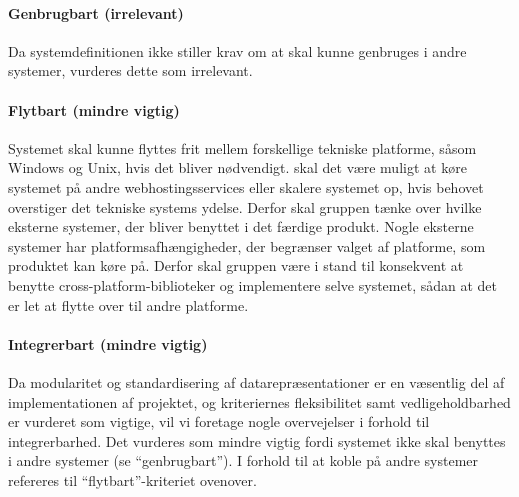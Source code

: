 \paragraph{Genbrugbart (irrelevant)} 
Da systemdefinitionen ikke stiller krav om at \Foodl{} skal kunne genbruges i andre systemer, vurderes dette som irrelevant.

\paragraph{Flytbart (mindre vigtig)} 
Systemet skal kunne flyttes frit mellem forskellige tekniske platforme, såsom Windows og Unix, hvis det bliver nødvendigt. \Fx skal det være muligt at køre systemet på andre webhostingsservices eller skalere systemet op, hvis behovet overstiger det tekniske systems ydelse. Derfor skal gruppen tænke over hvilke eksterne systemer, der bliver benyttet i det færdige produkt. Nogle eksterne systemer har platformsafhængigheder, der begrænser valget af platforme, som produktet kan køre på. Derfor skal gruppen være i stand til konsekvent at benytte cross-platform-biblioteker og implementere selve systemet, sådan at det er let at flytte over til andre platforme.

\paragraph{Integrerbart (mindre vigtig)} 
Da modularitet og standardisering af datarepræsentationer er en væsentlig del af implementationen af projektet, og kriteriernes fleksibilitet samt vedligeholdbarhed er vurderet som vigtige, vil vi foretage nogle overvejelser i forhold til integrerbarhed. Det vurderes som mindre vigtig fordi systemet ikke skal benyttes i andre systemer (se ``genbrugbart''). I forhold til at koble på andre systemer refereres til ``flytbart''-kriteriet ovenover.
